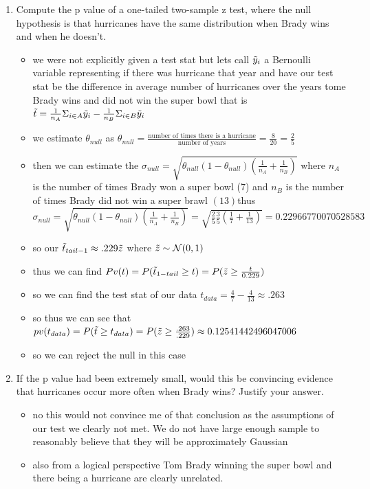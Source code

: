 \documentclass[12pt,twoside]{article}
\begin{document}
\begin{enumerate}
\begin{center}
{\begin{tabular}
\hline
\end{tabular}
}
\endgroup
\end{center}
\begin{enumerate}
\item Compute the p value of a one-tailed two-sample z test, where the null hypothesis is that hurricanes have the same distribution when Brady wins and when he doesn't. 
\begin{itemize}
    \color{blue}
    \item we were not explicitly given a test stat but lets call $\Tilde{y}_{i}$ a Bernoulli variable representing if there was hurricane that year and have our test stat be the difference in average number of hurricanes over the years tome Brady wins and did not win the super bowl that is $\Tilde{t}=\frac{1}{n_A}\Sigma_{i\in A}\Tilde{y}_i-\frac{1}{n_B}\Sigma_{i\in B}\Tilde{y}_i$
    
    \item we estimate $\theta_{null}$ as $\theta_{null}=\frac{\text{number of times there is a hurricane}}{\text{number of years}}=\frac{8}{20}=\frac{2}{5}$
    \item then we can estimate the $\sigma_{null}=\sqrt{\theta_{null}(1-\theta_{null})(\frac{1}{n_A}+\frac{1}{n_B})}$ where $n_A$ is the number of times Brady won a super bowl (7) and $n_B$ is the number of times Brady did not win a super brawl $(13)$thus $\sigma_{null}=\sqrt{\theta_{null}(1-\theta_{null})(\frac{1}{n_A}+\frac{1}{n_B})}=\sqrt{\frac{2}{5}\frac{3}{5}(\frac{1}{7}+\frac{1}{13})}=0.22966770070528583$
    \item so our $\Tilde{t}_{tail-1}\approx.229\Tilde{z}$ where $\Tilde{z}\sim \mathcal{N}(0,1)$
    \item thus we can find $Pv(t)=P(\Tilde{t}_{1-tail}\geq t)=P(\Tilde{z}\geq \frac{t}{0.229})$ \item so we can find the test stat of our data  ${t}_{data}=\frac{4}{7}-\frac{4}{13}\approx .263$
    \item so thus we can see that $pv({t}_{data})=P(\Tilde{t}\geq {t}_{data})=P(\Tilde{z}\geq \frac{.263}{.229})\approx0.12541442496047006$
    \item so we can reject the null in this case 
\end{itemize}

\item If the p value had been extremely small, would this be convincing evidence that hurricanes occur more often when Brady wins? Justify your answer.
\begin{itemize}
    \color{blue}
    \item no this would not convince me of that conclusion as the assumptions of our test we clearly not met. We do not have large enough sample to reasonably believe that they will be approximately Gaussian 
    \item also from a logical perspective Tom Brady winning the super bowl and there being a hurricane are clearly unrelated. 
\end{itemize}
\end{enumerate}
\newpage






\end{enumerate}
\end{document}
